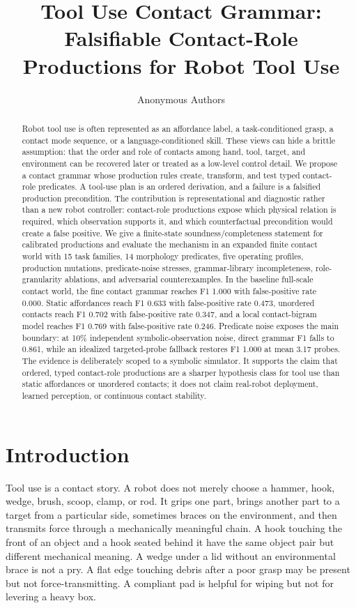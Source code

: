 \documentclass{article}
\title{Tool Use Contact Grammar: Falsifiable Contact-Role Productions for Robot Tool Use}
\author{Anonymous Authors}
\begin{document}
\maketitle

\begin{abstract}
Robot tool use is often represented as an affordance label, a task-conditioned grasp, a contact mode sequence, or a language-conditioned skill. These views can hide a brittle assumption: that the order and role of contacts among hand, tool, target, and environment can be recovered later or treated as a low-level control detail. We propose a contact grammar whose production rules create, transform, and test typed contact-role predicates. A tool-use plan is an ordered derivation, and a failure is a falsified production precondition. The contribution is representational and diagnostic rather than a new robot controller: contact-role productions expose which physical relation is required, which observation supports it, and which counterfactual precondition would create a false positive. We give a finite-state soundness/completeness statement for calibrated productions and evaluate the mechanism in an expanded finite contact world with 15 task families, 14 morphology predicates, five operating profiles, production mutations, predicate-noise stresses, grammar-library incompleteness, role-granularity ablations, and adversarial counterexamples. In the baseline full-scale contact world, the fine contact grammar reaches F1 1.000 with false-positive rate 0.000. Static affordances reach F1 0.633 with false-positive rate 0.473, unordered contacts reach F1 0.702 with false-positive rate 0.347, and a local contact-bigram model reaches F1 0.769 with false-positive rate 0.246. Predicate noise exposes the main boundary: at 10\% independent symbolic-observation noise, direct grammar F1 falls to 0.861, while an idealized targeted-probe fallback restores F1 1.000 at mean 3.17 probes. The evidence is deliberately scoped to a symbolic simulator. It supports the claim that ordered, typed contact-role productions are a sharper hypothesis class for tool use than static affordances or unordered contacts; it does not claim real-robot deployment, learned perception, or continuous contact stability.
\end{abstract}

\section{Introduction}

Tool use is a contact story. A robot does not merely choose a hammer, hook, wedge, brush, scoop, clamp, or rod. It grips one part, brings another part to a target from a particular side, sometimes braces on the environment, and then transmits force through a mechanically meaningful chain. A hook touching the front of an object and a hook seated behind it have the same object pair but different mechanical meaning. A wedge under a lid without an environmental brace is not a pry. A flat edge touching debris after a poor grasp may be present but not force-transmitting. A compliant pad is helpful for wiping but not for levering a heavy box.
\end{document}
